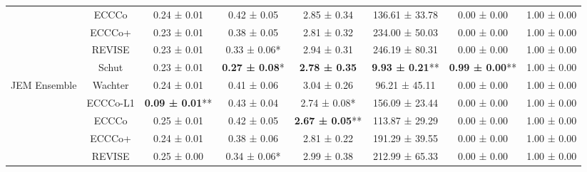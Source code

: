\begin{table}
{\begin{tabular}[t]{cccccccc}
 & ECCCo & 0.24 ± 0.01\hphantom{*}\hphantom{*} & 0.42 ± 0.05\hphantom{*}\hphantom{*} & 2.85 ± 0.34\hphantom{*}\hphantom{*} & 136.61 ± 33.78\hphantom{*}\hphantom{*} & 0.00 ± 0.00\hphantom{*}\hphantom{*} & 1.00 ± 0.00\hphantom{*}\hphantom{*}\\

 & ECCCo+ & 0.23 ± 0.01\hphantom{*}\hphantom{*} & 0.38 ± 0.05\hphantom{*}\hphantom{*} & 2.81 ± 0.32\hphantom{*}\hphantom{*} & 234.00 ± 50.03\hphantom{*}\hphantom{*} & 0.00 ± 0.00\hphantom{*}\hphantom{*} & 1.00 ± 0.00\hphantom{*}\hphantom{*}\\

 & REVISE & 0.23 ± 0.01\hphantom{*}\hphantom{*} & 0.33 ± 0.06*\hphantom{*} & 2.94 ± 0.31\hphantom{*}\hphantom{*} & 246.19 ± 80.31\hphantom{*}\hphantom{*} & 0.00 ± 0.00\hphantom{*}\hphantom{*} & 1.00 ± 0.00\hphantom{*}\hphantom{*}\\

 & Schut & 0.23 ± 0.01\hphantom{*}\hphantom{*} & \textbf{0.27 ± 0.08}*\hphantom{*} & \textbf{2.78 ± 0.35}\hphantom{*}\hphantom{*} & \textbf{9.93 ± 0.21}** & \textbf{0.99 ± 0.00}** & 1.00 ± 0.00\hphantom{*}\hphantom{*}\\

\multirow[t]{-6}{*}{\centering\arraybackslash JEM Ensemble} & Wachter & 0.24 ± 0.01\hphantom{*}\hphantom{*} & 0.41 ± 0.06\hphantom{*}\hphantom{*} & 3.04 ± 0.26\hphantom{*}\hphantom{*} & 96.21 ± 45.11\hphantom{*}\hphantom{*} & 0.00 ± 0.00\hphantom{*}\hphantom{*} & 1.00 ± 0.00\hphantom{*}\hphantom{*}\\
\cmidrule{1-8}
 & ECCCo-L1 & \textbf{0.09 ± 0.01}** & 0.43 ± 0.04\hphantom{*}\hphantom{*} & 2.74 ± 0.08*\hphantom{*} & 156.09 ± 23.44\hphantom{*}\hphantom{*} & 0.00 ± 0.00\hphantom{*}\hphantom{*} & 1.00 ± 0.00\hphantom{*}\hphantom{*}\\

 & ECCCo & 0.25 ± 0.01\hphantom{*}\hphantom{*} & 0.42 ± 0.05\hphantom{*}\hphantom{*} & \textbf{2.67 ± 0.05}** & 113.87 ± 29.29\hphantom{*}\hphantom{*} & 0.00 ± 0.00\hphantom{*}\hphantom{*} & 1.00 ± 0.00\hphantom{*}\hphantom{*}\\

 & ECCCo+ & 0.24 ± 0.01\hphantom{*}\hphantom{*} & 0.38 ± 0.06\hphantom{*}\hphantom{*} & 2.81 ± 0.22\hphantom{*}\hphantom{*} & 191.29 ± 39.55\hphantom{*}\hphantom{*} & 0.00 ± 0.00\hphantom{*}\hphantom{*} & 1.00 ± 0.00\hphantom{*}\hphantom{*}\\

 & REVISE & 0.25 ± 0.00\hphantom{*}\hphantom{*} & 0.34 ± 0.06*\hphantom{*} & 2.99 ± 0.38\hphantom{*}\hphantom{*} & 212.99 ± 65.33\hphantom{*}\hphantom{*} & 0.00 ± 0.00\hphantom{*}\hphantom{*} & 1.00 ± 0.00\hphantom{*}\hphantom{*}\\


\end{tabular}}
\end{table}

